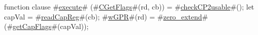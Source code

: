 function clause #\hyperref[zexecute]{execute}# (#\hyperref[zCGetFlags]{CGetFlags}#(rd, cb)) =
{
  #\hyperref[zcheckCP2usable]{checkCP2usable}#();
  let capVal = #\hyperref[zreadCapReg]{readCapReg}#(cb);
  #\hyperref[zwGPR]{wGPR}#(rd) = #\hyperref[zzzerozyextend]{zero\_extend}#(#\hyperref[zgetCapFlags]{getCapFlags}#(capVal));
}
